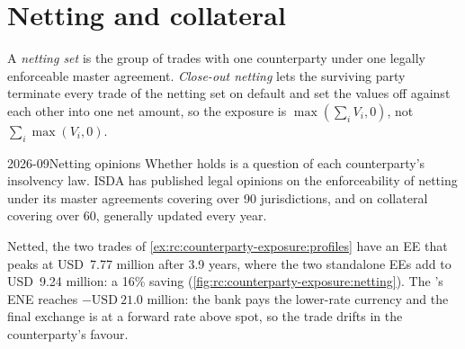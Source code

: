 \section{Netting and collateral}

\begin{definition}\label{def:rc:counterparty-exposure:netting}
A \emph{netting set} is the group of trades with one counterparty under
one legally enforceable master agreement. \emph{Close-out netting}
lets the surviving party terminate every trade of the netting set on default and set the
values off against each other into one net amount, so the exposure is
$\max(\sum_iV_i,0)$, not $\sum_i\max(V_i,0)$.
\end{definition}

\begin{dated}{2026-09}{Netting opinions}\label{dat:rc:counterparty-exposure:opinions}
Whether  holds is a question of each counterparty's insolvency law. ISDA has
published legal opinions on the enforceability of netting under its master agreements covering over 90
jurisdictions, and on collateral covering over 60, generally updated every year.
\end{dated}

\begin{example}\label{ex:rc:counterparty-exposure:netting}
Netted, the two trades of \cref{ex:rc:counterparty-exposure:profiles} have an EE that peaks
at USD~7.77 million after 3.9 years, where the two standalone EEs add to USD~9.24 million:
a 16\% saving (\cref{fig:rc:counterparty-exposure:netting}). The 's ENE reaches
$-\text{USD}~21.0$ million: the bank pays the lower-rate currency and the final exchange is
at a forward rate above spot, so the trade drifts in the counterparty's favour.
\end{example}

